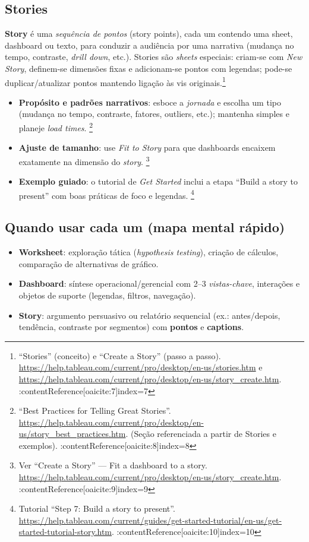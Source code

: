 \subsection{Stories}
\textbf{Story} é uma \textit{sequência de pontos} (story points), cada um contendo uma sheet, dashboard ou texto, para conduzir a audiência por uma narrativa (mudança no tempo, contraste, \textit{drill down}, etc.). Stories são \textit{sheets} especiais: criam-se com \textit{New Story}, definem-se dimensões fixas e adicionam-se pontos com legendas; pode-se duplicar/atualizar pontos mantendo ligação às vis originais.\footnote{``Stories'' (conceito) e ``Create a Story'' (passo a passo). \url{https://help.tableau.com/current/pro/desktop/en-us/stories.htm} e \url{https://help.tableau.com/current/pro/desktop/en-us/story_create.htm}. :contentReference[oaicite:7]{index=7}}
\begin{itemize}[leftmargin=*]
  \item \textbf{Propósito e padrões narrativos}: esboce a \textit{jornada} e escolha um tipo (mudança no tempo, contraste, fatores, outliers, etc.); mantenha simples e planeje \textit{load times}. \footnote{``Best Practices for Telling Great Stories''. \url{https://help.tableau.com/current/pro/desktop/en-us/story_best_practices.htm}. (Seção referenciada a partir de Stories e exemplos). :contentReference[oaicite:8]{index=8}}
  \item \textbf{Ajuste de tamanho}: use \textit{Fit to Story} para que dashboards encaixem exatamente na dimensão do \textit{story}. \footnote{Ver ``Create a Story'' — Fit a dashboard to a story. \url{https://help.tableau.com/current/pro/desktop/en-us/story_create.htm}. :contentReference[oaicite:9]{index=9}}
  \item \textbf{Exemplo guiado}: o tutorial de \textit{Get Started} inclui a etapa ``Build a story to present'' com boas práticas de foco e legendas. \footnote{Tutorial ``Step 7: Build a story to present''. \url{https://help.tableau.com/current/guides/get-started-tutorial/en-us/get-started-tutorial-story.htm}. :contentReference[oaicite:10]{index=10}}
\end{itemize}

\subsection{Quando usar cada um (mapa mental rápido)}
\begin{itemize}[leftmargin=*]
  \item \textbf{Worksheet}: exploração tática (\textit{hypothesis testing}), criação de cálculos, comparação de alternativas de gráfico.
  \item \textbf{Dashboard}: síntese operacional/gerencial com 2–3 \textit{vistas-chave}, interações e objetos de suporte (legendas, filtros, navegação).
  \item \textbf{Story}: argumento persuasivo ou relatório sequencial (ex.: antes/depois, tendência, contraste por segmentos) com \textbf{pontos} e \textbf{captions}.
\end{itemize}

